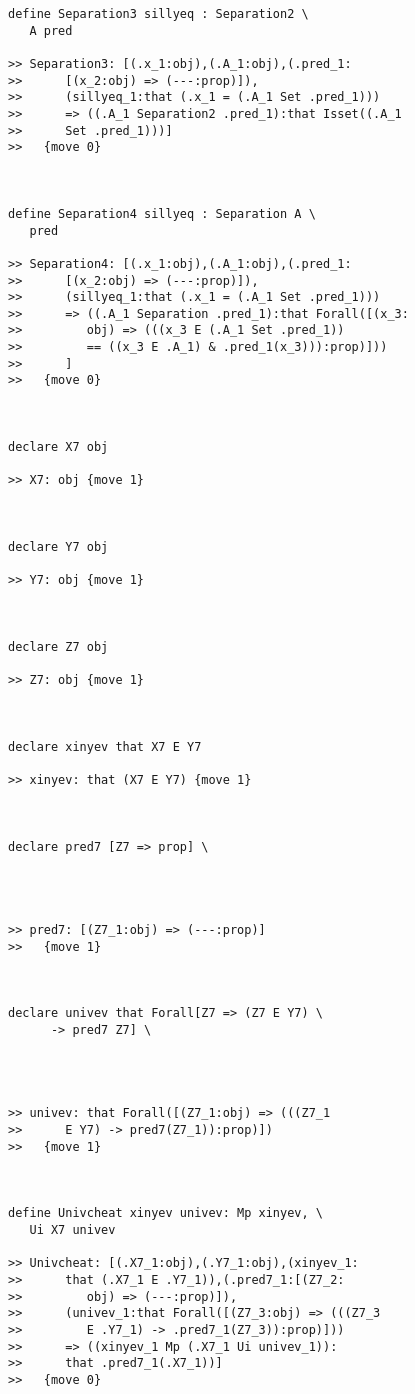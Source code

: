 \documentclass[12pt]{article}
\begin{document}
\begin{verbatim}
define Separation3 sillyeq : Separation2 \
   A pred

>> Separation3: [(.x_1:obj),(.A_1:obj),(.pred_1:
>>      [(x_2:obj) => (---:prop)]),
>>      (sillyeq_1:that (.x_1 = (.A_1 Set .pred_1)))
>>      => ((.A_1 Separation2 .pred_1):that Isset((.A_1
>>      Set .pred_1)))]
>>   {move 0}



define Separation4 sillyeq : Separation A \
   pred

>> Separation4: [(.x_1:obj),(.A_1:obj),(.pred_1:
>>      [(x_2:obj) => (---:prop)]),
>>      (sillyeq_1:that (.x_1 = (.A_1 Set .pred_1)))
>>      => ((.A_1 Separation .pred_1):that Forall([(x_3:
>>         obj) => (((x_3 E (.A_1 Set .pred_1))
>>         == ((x_3 E .A_1) & .pred_1(x_3))):prop)]))
>>      ]
>>   {move 0}



declare X7 obj

>> X7: obj {move 1}



declare Y7 obj

>> Y7: obj {move 1}



declare Z7 obj

>> Z7: obj {move 1}



declare xinyev that X7 E Y7

>> xinyev: that (X7 E Y7) {move 1}



declare pred7 [Z7 => prop] \
   



>> pred7: [(Z7_1:obj) => (---:prop)]
>>   {move 1}



declare univev that Forall[Z7 => (Z7 E Y7) \
      -> pred7 Z7] \
   



>> univev: that Forall([(Z7_1:obj) => (((Z7_1
>>      E Y7) -> pred7(Z7_1)):prop)])
>>   {move 1}



define Univcheat xinyev univev: Mp xinyev, \
   Ui X7 univev

>> Univcheat: [(.X7_1:obj),(.Y7_1:obj),(xinyev_1:
>>      that (.X7_1 E .Y7_1)),(.pred7_1:[(Z7_2:
>>         obj) => (---:prop)]),
>>      (univev_1:that Forall([(Z7_3:obj) => (((Z7_3
>>         E .Y7_1) -> .pred7_1(Z7_3)):prop)]))
>>      => ((xinyev_1 Mp (.X7_1 Ui univev_1)):
>>      that .pred7_1(.X7_1))]
>>   {move 0}




\end{verbatim}
\end{document}
